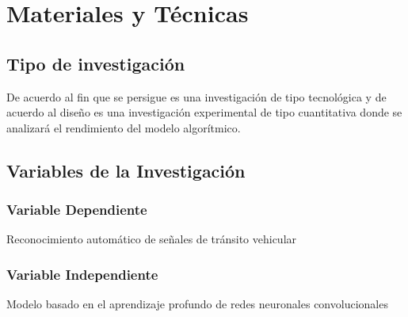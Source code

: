 \chapter{Materiales y Técnicas}
\setcounter{page}{53}
\renewcommand{\baselinestretch}{2} %

\section{ Tipo de investigación}
	De acuerdo al fin que se persigue es una investigación de tipo tecnológica y de acuerdo al diseño es una investigación experimental de tipo cuantitativa donde se analizará el rendimiento del modelo algorítmico.

\section{Variables de la Investigación}
		
		\subsection{Variable Dependiente}
		\indent Reconocimiento automático de señales de tránsito vehicular
		\subsection {Variable Independiente}
		\indent Modelo basado en el aprendizaje profundo de redes neuronales convolucionales	
		
